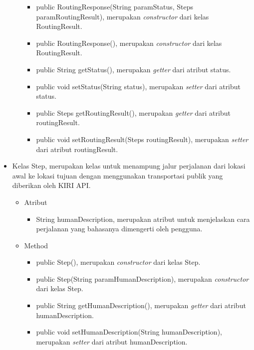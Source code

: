\begin{itemize}
\begin{itemize}
					
									\begin{itemize}
												\item public RoutingResponse(String paramStatus, Steps paramRoutingResult), merupakan \textit{constructor} dari kelas RoutingResult.
												\item public RoutingResponse(), merupakan \textit{constructor} dari kelas RoutingResult.
												\item public String getStatus(), merupakan \textit{getter} dari atribut status.
												\item public void setStatus(String status), merupakan \textit{setter} dari atribut status.
												\item public Steps getRoutingResult(), merupakan \textit{getter} dari atribut routingResult.
												\item public void setRoutingResult(Steps routingResult), merupakan \textit{setter} dari atribut routingResult.
									\end{itemize}
				\end{itemize}
		
		\item Kelas Step, merupakan kelas untuk menampung jalur perjalanan dari lokasi awal ke lokasi tujuan dengan menggunakan transportasi publik yang diberikan oleh KIRI API.
		
		
				\begin{itemize}
							\item Atribut
					
					
									\begin{itemize}
												\item String humanDescription, merupakan atribut untuk menjelaskan cara perjalanan yang bahasanya dimengerti oleh pengguna.
									\end{itemize}
					
							\item Method
					
					
									\begin{itemize}
												\item public Step(), merupakan \textit{constructor} dari kelas Step.
												\item public Step(String paramHumanDescription), merupakan \textit{constructor} dari kelas Step.
												\item public String getHumanDescription(), merupakan \textit{getter} dari atribut humanDescription.
												\item public void setHumanDescription(String humanDescription), merupakan \textit{setter} dari atribut humanDescription.
									\end{itemize}
				\end{itemize}
		

\end{itemize}
